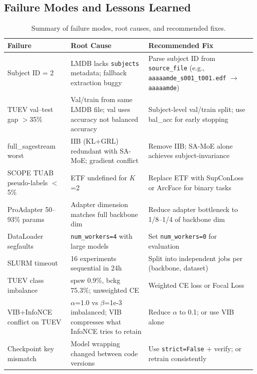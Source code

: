 \documentclass{article}
\begin{document}
\subsection{Failure Modes and Lessons Learned}
\label{sec:failures}

\begin{table}[h]
\centering
\small
\setlength{\tabcolsep}{2.5pt}
\begin{tabular}{@{}p{3.5cm}p{4.5cm}p{4.5cm}@{}}
\toprule
Failure & Root Cause & Recommended Fix \\
\midrule
Subject ID = 2 & LMDB lacks \texttt{subjects} metadata; fallback extraction buggy & Parse subject ID from \texttt{source\_file} (e.g., \texttt{aaaaamde\_s001\_t001.edf} $\to$ \texttt{aaaaamde}) \\
\addlinespace
TUEV val--test gap $>$35\% & Val/train from same LMDB file; val uses accuracy not balanced accuracy & Subject-level val/train split; use bal\_acc for early stopping \\
\addlinespace
full\_sagestream worst & IIB (KL+GRL) redundant with SA-MoE; gradient conflict & Remove IIB; SA-MoE alone achieves subject-invariance \\
\addlinespace
SCOPE TUAB pseudo-labels $<$5\% & ETF undefined for $K$=2 & Replace ETF with SupConLoss or ArcFace for binary tasks \\
\addlinespace
ProAdapter 50--93\% params & Adapter dimension matches full backbone dim & Reduce adapter bottleneck to 1/8--1/4 of backbone dim \\
\addlinespace
DataLoader segfaults & \texttt{num\_workers=4} with large models & Set \texttt{num\_workers=0} for evaluation \\
\addlinespace
SLURM timeout & 16 experiments sequential in 24h & Split into independent jobs per (backbone, dataset) \\
\addlinespace
TUEV class imbalance & spsw 0.9\%, bckg 75.3\%; unweighted CE & Weighted CE loss or Focal Loss \\
\addlinespace
VIB+InfoNCE conflict on TUEV & $\alpha$=1.0 vs $\beta$=1e-3 imbalanced; VIB compresses what InfoNCE tries to retain & Reduce $\alpha$ to 0.1; or use VIB alone \\
\addlinespace
Checkpoint key mismatch & Model wrapping changed between code versions & Use \texttt{strict=False} + verify; or retrain consistently \\
\bottomrule
\end{tabular}
\caption{Summary of failure modes, root causes, and recommended fixes.}
\end{table}
\end{document}

